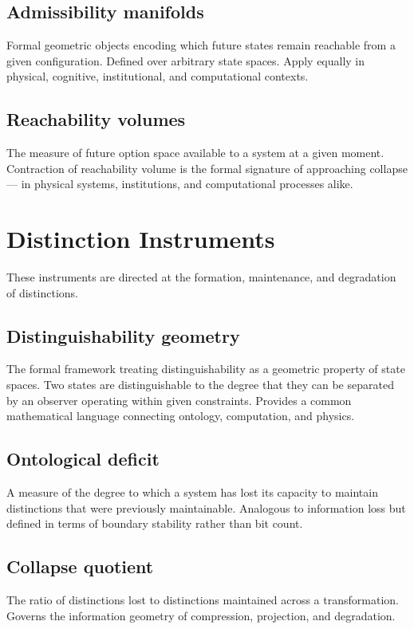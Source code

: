 \documentclass[12pt, openany]{book}
\begin{document}
\subsection{Admissibility manifolds} Formal geometric objects encoding which
future states remain reachable from a given configuration. Defined over
arbitrary state spaces. Apply equally in physical, cognitive, institutional,
and computational contexts.

\subsection{Reachability volumes} The measure of future option space
available to a system at a given moment. Contraction of reachability volume
is the formal signature of approaching collapse — in physical systems,
institutions, and computational processes alike.

\section{Distinction Instruments}

These instruments are directed at the formation, maintenance, and
degradation of distinctions.

\subsection{Distinguishability geometry} The formal framework treating
distinguishability as a geometric property of state spaces. Two states are
distinguishable to the degree that they can be separated by an observer
operating within given constraints. Provides a common mathematical language
connecting ontology, computation, and physics.

\subsection{Ontological deficit} A measure of the degree to which a system
has lost its capacity to maintain distinctions that were previously
maintainable. Analogous to information loss but defined in terms of
boundary stability rather than bit count.

\subsection{Collapse quotient} The ratio of distinctions lost to distinctions
maintained across a transformation. Governs the information geometry of
compression, projection, and degradation.
\end{document}
